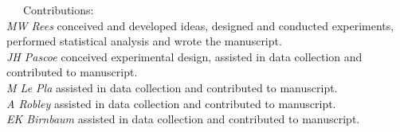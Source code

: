 \documentclass[11pt,a4paper,titlepage,twoside,openright]{style/unimelbthesis}
\begin{document}
\begin{frontmatter}
\begin{preface}
    ~~~Contributions:\\
    \hspace*{0.333em}\hspace*{0.333em}\hspace*{0.333em}\hspace*{0.333em}\hspace*{0.333em}\hspace*{0.333em}\hspace*{0.333em}\hspace*{0.333em}\emph{MW Rees} conceived and developed ideas, designed and conducted experiments, performed statistical analysis and wrote the manuscript.\\
    \hspace*{0.333em}\hspace*{0.333em}\hspace*{0.333em}\hspace*{0.333em}\hspace*{0.333em}\hspace*{0.333em}\hspace*{0.333em}\hspace*{0.333em}\emph{JH Pascoe} conceived experimental design, assisted in data collection and contributed to manuscript.\\
    \hspace*{0.333em}\hspace*{0.333em}\hspace*{0.333em}\hspace*{0.333em}\hspace*{0.333em}\hspace*{0.333em}\hspace*{0.333em}\hspace*{0.333em}\emph{M Le Pla} assisted in data collection and contributed to manuscript.\\
    \hspace*{0.333em}\hspace*{0.333em}\hspace*{0.333em}\hspace*{0.333em}\hspace*{0.333em}\hspace*{0.333em}\hspace*{0.333em}\hspace*{0.333em}\emph{A Robley} assisted in data collection and contributed to manuscript.\\
    \hspace*{0.333em}\hspace*{0.333em}\hspace*{0.333em}\hspace*{0.333em}\hspace*{0.333em}\hspace*{0.333em}\hspace*{0.333em}\hspace*{0.333em}\emph{EK Birnbaum} assisted in data collection and contributed to manuscript.\\

\end{preface}
\end{frontmatter}
\end{document}
